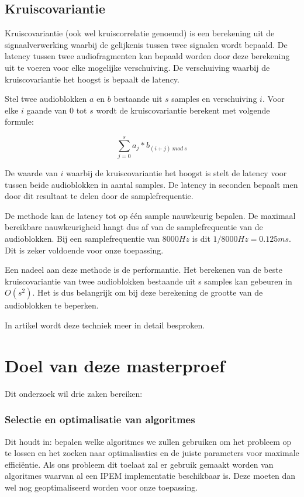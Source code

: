 \subsection{Kruiscovariantie}

Kruiscovariantie (ook wel kruiscorrelatie genoemd) is een berekening uit de signaalverwerking waarbij de gelijkenis tussen twee signalen wordt bepaald. De latency tussen twee audiofragmenten kan bepaald worden door deze berekening uit te voeren voor elke mogelijke verschuiving. De verschuiving waarbij de kruiscovariantie het hoogst is bepaalt de latency.

Stel twee audioblokken $ a $ en $ b $ bestaande uit $ s $ samples en verschuiving $ i $. Voor elke $ i $ gaande van 0 tot $ s $ wordt de kruiscovariantie berekent met volgende formule:

\begin{equation}
 \sum_{j=0}^{s} a_{j} * b_{(i+j)\ mod\ s}
\end{equation}

De waarde van $ i $ waarbij de kruiscovariantie het hoogst is stelt de latency voor tussen beide audioblokken in aantal samples. De latency in seconden bepaalt men door dit resultaat te delen door de samplefrequentie.

De methode kan de latency tot op één sample nauwkeurig bepalen. De maximaal bereikbare nauwkeurigheid hangt dus af van de samplefrequentie van de audioblokken. Bij een samplefrequentie van $8000 Hz$ is dit $ 1/8000 Hz = 0.125 ms $. Dit is zeker voldoende voor onze toepassing.

Een nadeel aan deze methode is de performantie. Het berekenen van de beste kruiscovariantie van twee audioblokken bestaande uit s samples kan gebeuren in  $O(s^{2})$. Het is dus belangrijk om bij deze berekening de grootte van de audioblokken te beperken.

In artikel \citealp{six2015multimodal} wordt deze techniek meer in detail besproken.

\section{Doel van deze masterproef}

Dit onderzoek wil drie zaken bereiken: 

\subsubsection{Selectie en optimalisatie van algoritmes}
Dit houdt in: bepalen welke algoritmes we zullen gebruiken om het probleem op te lossen en het zoeken naar optimalisaties en de juiste parameters voor maximale efficiëntie. Als ons probleem dit toelaat zal er gebruik gemaakt worden van algoritmes waarvan al een IPEM implementatie beschikbaar is. Deze moeten dan wel nog geoptimaliseerd worden voor onze toepassing. 

